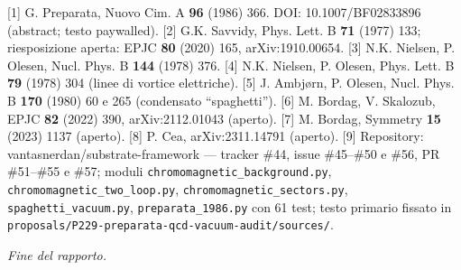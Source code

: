 \documentclass[
]{article}
\begin{document}
{[}1{]} G. Preparata, Nuovo Cim. A \textbf{96} (1986) 366. DOI:
10.1007/BF02833896 (abstract; testo paywalled). {[}2{]} G.K. Savvidy,
Phys. Lett. B \textbf{71} (1977) 133; riesposizione aperta: EPJC
\textbf{80} (2020) 165, arXiv:1910.00654. {[}3{]} N.K. Nielsen, P.
Olesen, Nucl. Phys. B \textbf{144} (1978) 376. {[}4{]} N.K. Nielsen, P.
Olesen, Phys. Lett. B \textbf{79} (1978) 304 (linee di vortice
elettriche). {[}5{]} J. Ambjørn, P. Olesen, Nucl. Phys. B \textbf{170}
(1980) 60 e 265 (condensato ``spaghetti''). {[}6{]} M. Bordag, V.
Skalozub, EPJC \textbf{82} (2022) 390, arXiv:2112.01043 (aperto).
{[}7{]} M. Bordag, Symmetry \textbf{15} (2023) 1137 (aperto). {[}8{]} P.
Cea, arXiv:2311.14791 (aperto). {[}9{]} Repository:
vantasnerdan/substrate-framework --- tracker \#44, issue \#45--\#50 e
\#56, PR \#51--\#55 e \#57; moduli
\texttt{chromomagnetic\_background.py},
\texttt{chromomagnetic\_two\_loop.py},
\texttt{chromomagnetic\_sectors.py}, \texttt{spaghetti\_vacuum.py},
\texttt{preparata\_1986.py} con 61 test; testo primario fissato in
\texttt{proposals/P229-preparata-qcd-vacuum-audit/sources/}.

\emph{Fine del rapporto.}
\end{document}
